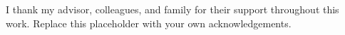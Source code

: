 
I thank my advisor, colleagues, and family for their support throughout this work.
Replace this placeholder with your own acknowledgements.
